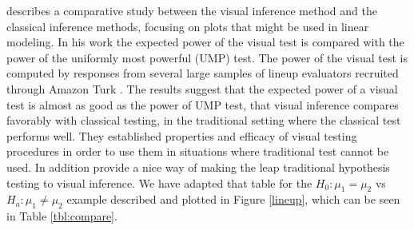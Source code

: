 \cite{majumder:2013} describes a comparative study between the visual inference method and the classical inference methods, focusing on plots that might be used in linear modeling. In his work the expected power of the visual test is compared with the power of the uniformly most powerful (UMP) test. The power of the visual test is computed by responses from several large samples of lineup evaluators recruited through Amazon Turk \citep{turk}. The results suggest that the expected power of a visual test is almost as good as the power of UMP test, that visual inference compares favorably with classical testing, in the traditional setting where the classical test performs well. They established properties and efficacy of visual testing procedures in order to use them in situations where traditional test cannot be used. In addition \cite{majumder:2013} provide a nice way of making the leap traditional hypothesis testing to visual inference. We have adapted that table for the $H_0: \mu_1 =  \mu_2$ vs $H_a: \mu_1 \ne \mu_2$ example described and plotted in Figure \ref{lineup}, which can be seen in Table \ref{tbl:compare}.


